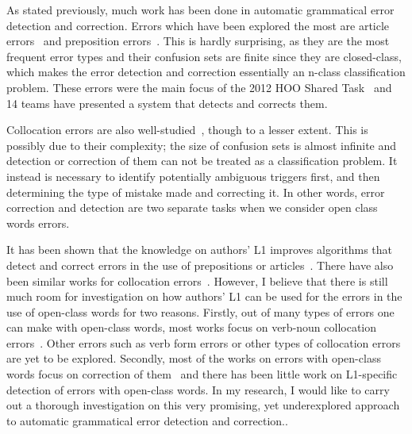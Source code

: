 \documentclass[11pt]{article}
\begin{document}
As stated previously, much work has been done in automatic grammatical error detection and correction. Errors which have been explored the most are article errors~\citep{han2006detecting, rozovskaya2010training, turner2007language, dahlmeier2011grammatical, de2008classifier} and preposition errors~\citep{bergsma2009web, tetreault2008ups, tetreault2010using, dahlmeier2011grammatical, de2008classifier, chodorow2007detection}. This is hardly surprising, as they are the most frequent error types and their confusion sets are finite since they are closed-class, which makes the error detection and correction essentially an n-class classification problem. These errors were the main focus of the 2012 HOO Shared Task~\citep{dale2012hoo} and 14 teams have presented a system that detects and corrects them.

Collocation errors are also well-studied~\citep{shei2000esl, wible2003bootstrapping, futagi2008computational, liu2009automated}, though to a lesser extent. This is possibly due to their complexity; the size of confusion sets is almost infinite and detection or correction of them can not be treated as a classification problem. It instead is necessary to identify potentially ambiguous triggers first, and then determining the type of mistake made and correcting it. In other words, error correction and detection are two separate tasks when we consider open class words errors.

It has been shown that the knowledge on authors' L1 improves algorithms that detect and correct errors in the use of prepositions or articles~\citep{rozovskaya2010generating, rozovskaya2011algorithm}. There have also been similar works for collocation errors~\citep{chang2008automatic, dahlmeier2011correcting, shei2000esl, liu2009automated}. However, I believe that there is still much room for investigation on how authors' L1 can be used for the errors in the use of open-class words for two reasons. Firstly, out of many types of errors one can make with open-class words, most works focus on verb-noun collocation errors~\citep{chang2008automatic, shei2000esl, liu2009automated}. Other errors such as verb form errors or other types of collocation errors are yet to be explored. Secondly, most of the works on errors with open-class words focus on correction of them~\citep{dahlmeier2011correcting, chang2008automatic} and there has been little work on L1-specific detection of errors with open-class words.  In my research, I would like to carry out a thorough investigation on this very promising, yet underexplored approach to automatic grammatical error detection and correction..
\end{document}

